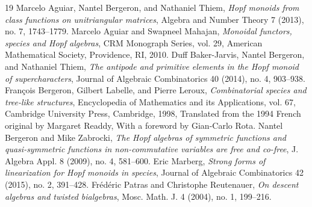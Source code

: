 \documentclass[10pt]{amsart}
\theoremstyle{definition}
\begin{document}
\begin{thebibliography}{19}
 Marcelo Aguiar, Nantel Bergeron, and Nathaniel Thiem, \emph{Hopf monoids from class functions on unitriangular matrices}, Algebra and Number Theory 7 (2013), no. 7, 1743--1779.
 Marcelo Aguiar and Swapneel Mahajan, \emph{Monoidal functors, species and Hopf algebras}, CRM Monograph Series, vol. 29, American Mathematical Society, Providence, RI, 2010.
 Duff Baker-Jarvis, Nantel Bergeron, and Nathaniel Thiem, \emph{The antipode and primitive elements in the Hopf monoid of supercharacters}, Journal of Algebraic Combinatorics 40 (2014), no. 4, 903--938.
 Fran\c{c}ois Bergeron, Gilbert Labelle, and Pierre Leroux, \emph{Combinatorial species and tree-like structures}, Encyclopedia of Mathematics and its Applications, vol. 67, Cambridge University Press, Cambridge, 1998, Translated from the 1994 French original by Margaret Readdy, With a foreword by Gian-Carlo Rota.
 Nantel Bergeron and Mike Zabrocki, \emph{The Hopf algebras of symmetric functions and quasi-symmetric functions in non-commutative variables are free and co-free}, J. Algebra Appl. 8 (2009), no. 4, 581--600.
 Eric Marberg, \emph{Strong forms of linearization for Hopf monoids in species}, Journal of Algebraic Combinatorics 42 (2015), no. 2, 391--428.
 Fr\'ed\'eric Patras and Christophe Reutenauer, \emph{On descent algebras and twisted bialgebras}, Mosc. Math. J. 4 (2004), no. 1, 199--216.
\end{thebibliography}
\end{document}

